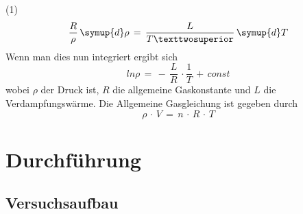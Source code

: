 \documentclass[
  parskip=half,
  bibliography=totoc,     %
  captions=tableheading,  %
  titlepage=firstiscover, %
]{scrartcl}
\begin{document}
(1)
\begin{equation}
  \frac{R}{\rho}\,\symup{d}\rho\,=\,\frac{L}{T²}\,\symup{d}T
\end{equation}
\label{eq:formel3}
Wenn man dies nun integriert ergibt sich
\begin{equation}
  ln\rho\,=\,-\,\frac{L}{R}\,\cdot\frac{1}{T}\,+\,const
\end{equation}
\label{eq:formel4}
wobei $\rho$ der Druck ist, $R$ die allgemeine Gaskonstante und $L$
die Verdampfungswärme.
Die Allgemeine Gasgleichung ist gegeben durch
\begin{equation}
  \rho\,\cdot\,V\,=\,n\,\cdot\,R\,\cdot\,T
\end{equation}
\label{eq:formel6}
\newpage
\section{Durchführung}
\label{sec:durchführung}
\subsection{Versuchsaufbau}
\label{sec:versuchsaufbau}
\end{document}
